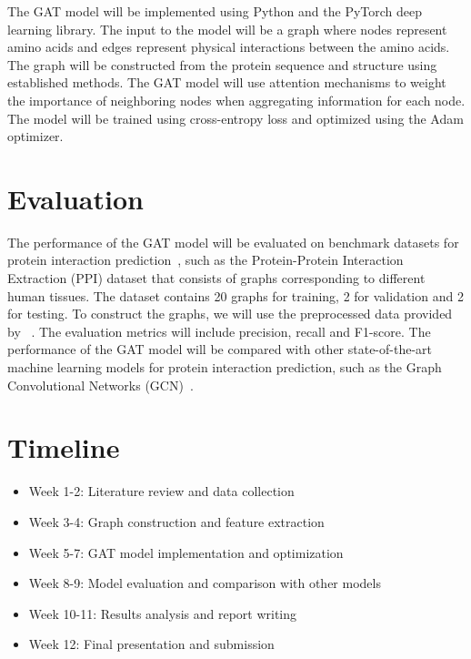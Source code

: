 \documentclass{article}
\begin{document}
    The GAT model will be implemented using Python and the PyTorch deep learning library.
    The input to the model will be a graph where nodes represent amino acids and edges represent physical interactions between the amino acids.
    The graph will be constructed from the protein sequence and structure using established methods.
    The GAT model will use attention mechanisms to weight the importance of neighboring nodes when aggregating information for each node.
    The model will be trained using cross-entropy loss and optimized using the Adam optimizer.


    \section{Evaluation}\label{sec:evaluation}

    The performance of the GAT model will be evaluated on benchmark datasets for protein interaction prediction~\cite{zitnik2017predicting},
    such as the Protein-Protein Interaction Extraction (PPI) dataset that consists of graphs corresponding to different human tissues.
    The dataset contains 20 graphs for training, 2 for validation and 2 for testing.
    To construct the graphs, we will use the preprocessed data provided by ~\cite{hamilton2017inductive}.
    The evaluation metrics will include precision, recall and F1-score.
    The performance of the GAT model will be compared with other state-of-the-art machine learning models for protein interaction prediction,
    such as the Graph Convolutional Networks (GCN)~\cite{kipf2016semi}.


    \section{Timeline}\label{sec:timeline}

    \begin{itemize}
        \item Week 1-2: Literature review and data collection
        \item Week 3-4: Graph construction and feature extraction
        \item Week 5-7: GAT model implementation and optimization
        \item Week 8-9: Model evaluation and comparison with other models
        \item Week 10-11: Results analysis and report writing
        \item Week 12: Final presentation and submission
    \end{itemize}
\end{document}
